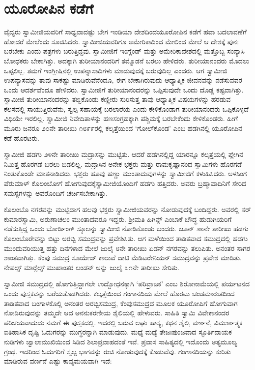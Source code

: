 
\chapter{ಯೂರೋಪಿನ ಕಡೆಗೆ }

 ವೈದ್ಯರು ಸ್ವಾಮೀಜಿಯವರಿಗೆ ಸಾಧ್ಯವಾದಷ್ಟು ಬೇಗ ಇಂಡಿಯಾ ದೇಶದಿಂದ\break ಯೂರೋಪಿನ ಕಡೆಗೆ ಹವಾ ಬದಲಾವಣೆಗೆ ಹೋದರೆ ಮೇಲೆಂದು ಸೂಚಿಸಿದರು. ಸ್ವಾಮೀಜಿಯವರಿಗೂ ಅಮೇರಿಕಾದಿಂದ ಮೇಲಿಂದ ಮೇಲೆ ಆ ದೇಶಕ್ಕೆ ಪುನಃ ಬರಬೇಕು ಎಂದು ಪತ್ರಗಳು ಬರುತ್ತಿದ್ದವು. ಸ್ವಾಮೀಜಿಗೆ ಇಂಗ್ಲೆಂಡ್ ಮತ್ತು ಅಮೇರಿಕಾದೇಶದಲ್ಲಿ ಮತ್ತೊಬ್ಬ ಸಂನ್ಯಾಸಿ ಬೋಧಕರು ಬೇಕಾಗಿತ್ತು. ಅದಕ್ಕಾಗಿ ತುರೀಯಾನಂದರಿಗೆ ತಮ್ಮೊಡನೆ ಬರಲು ಹೇಳಿದರು. ತುರೀಯಾನಂದರು ಮೊದಲು ಒಪ್ಪಲಿಲ್ಲ. ತಮಗೆ ಇಂಗ್ಲೀಷಿನಲ್ಲಿ ಉಪನ್ಯಾಸಾದಿಗಳು ಮಾಡುವುದಕ್ಕೆ ಬರುವುದಿಲ್ಲ ಎಂದರು. ಆಗ ಸ್ವಾಮೀಜಿ ಉಪನ್ಯಾಸವನ್ನು ತಾವು ಸಾಕಷ್ಟು ಮಾಡಿರುವೆನೆಂದೂ, ಈಗ ಬೇಕಾಗಿರುವುದು ಆಧ್ಯಾತ್ಮಿಕ ಜೀವನವನ್ನು ನಡೆಸುವವರ ಒಂದು ಆದರ್ಶವೆಂದೂ ಹೇಳಿದರು. ಸ್ವಾಮೀಜಿಗೆ ತುರೀಯಾನಂದರನ್ನು ಒಪ್ಪಿಸುವುದೇ ಒಂದು ದೊಡ್ಡ ಕಷ್ಟವಾಗಿತ್ತು. ಸ್ವಾಮೀಜಿ ತುರೀಯಾನಂದರನ್ನು ತಬ್ಬಿಕೊಂಡು ಕಣ್ಣೀರು ಸುರಿಸುತ್ತ ತಾವು ಆಧ್ಯಾತ್ಮಿಕ ವಿಷಯಗಳನ್ನು ಹರಡುವ ಕೆಲಸದಲ್ಲಿ ಸಾಯುತ್ತಿರುವೆನು, ಸ್ವಲ್ಪ ಸಹಾಯಕ್ಕೆ ಬರಲಾರೆಯ ಎಂದು ಕೇಳಿಕೊಂಡಾಗ ತುರೀಯಾನಂದರು ಒಪ್ಪಿಕೊಳ್ಳದೆ ವಿಧಿಯೇ ಇರಲಿಲ್ಲ. ಸ್ವಾಮೀಜಿ ನಿವೇದಿತಾಳನ್ನು ಹಣಸಂಗ್ರಹಕ್ಕಾಗಿ ಪಶ್ಚಿಮಕ್ಕೆ ಬರಬೇಕೆಂದು ಕೇಳಿಕೊಂಡರು. ಹೀಗೆ ಮೂರು ಜನರೂ ೨೦ನೇ ತಾರೀಖು ೧೮೯೯ರಲ್ಲಿ ಕಲ್ಕತ್ತೆಯಿಂದ ‘ಗೋಲ್‍ಕೊಂಡ’ ಎಂಬ ಹಡಗಿನಲ್ಲಿ ಯೂರೋಪಿನ ಕಡೆ ಹೊರಟರು. 

 ಸ್ವಾಮೀಜಿ ಹಡಗು ೨೪ನೇ ತಾರೀಖು ಮದ್ರಾಸನ್ನು ಮುಟ್ಟಿತು. ಆದರೆ ಹಡಗಿನಲ್ಲಿದ್ದ ಯಾರನ್ನೂ ಕಲ್ಕತ್ತೆಯಲ್ಲಿ ಪ್ಲೇಗಿನ ನಿಮಿತ್ತ ಹೊರಗಡೆ ಬರಲು ಬಿಡಲಿಲ್ಲ. ಮದ್ರಾಸಿನ ಅನೇಕ ಭಕ್ತರು ಮತ್ತು ರಾಮಕೃಷ್ಣಾನಂದ ಸ್ವಾಮಿಗಳು ಹೊರಗಡೆ ನಿಂತುಕೊಂಡೇ ಮಾತನಾಡಿದರು. ಭಕ್ತರು ಹೂವು ಹಣ್ಣು ಮುಂತಾದುವುಗಳನ್ನು ಸ್ವಾಮೀಜಿಗೆ ಕಳುಹಿಸಿದರು. ಅಳಸಿಂಗ ಪೆರುಮಾಳ್ ಕೊಲಂಬೋಗೆ ಹೋಗುವುದಕ್ಕೆ\break ಸ್ವಾಮೀಜಿಯೊಂದಿಗೆ ಹಡಗು ಹತ್ತಿದರು. ಅವರು ಬ್ರಹ್ಮಾವಾದಿನಿಗೆ ಸೇರಿದ ಸಮಸ್ಯೆಗಳನ್ನು ಅವರೊಂದಿಗೆ ಚರ್ಚಿಸಬೇಕಾಗಿತ್ತು. 

 ಕೊಲಂಬೊ ನಗರವನ್ನು ಮುಟ್ಟಿದಾಗ ಹಲವು ಭಕ್ತರು ಸ್ವಾಮೀಜಿಯವರನ್ನು ನೋಡುವುದಕ್ಕೆ ಬಂದಿದ್ದರು. ಅವರಲ್ಲಿ ಸರ್ ಕುಮಾರಸ್ವಾಮಿ, ಅರುಣಾಚಲಂ ಮುಂತಾದವರೂ ಇದ್ದರು. ಶ‍್ರೀಮತಿ ಹಿಗಿನ್ಸ್ ಎಂಬಾಕೆ ಬೌದ್ಧ ಹುಡುಗಿಯರಿಗೆ ನಡೆಸುತ್ತಿದ್ದ ಒಂದು ಬೋರ್ಡಿಂಗ್ ಸ್ಕೂಲನ್ನು ಸ್ವಾಮೀಜಿ ನೋಡಿಕೊಂಡು ಬಂದರು. ಜೂನ್ ೨೮ನೇ ತಾರೀಖು ಹಡಗು ಕೊಲಂಬೊರೇವನ್ನು ಬಿಟ್ಟು ಅರಬ್ಬಿ ಸಮುದ್ರವನ್ನು ಪ್ರವೇಶಿಸಿತು. ಆಗ ಮಳೆಯಿಂದ ತಾಡಿತವಾದ ಸಮುದ್ರದಲ್ಲಿ ಹಡಗು ಮುಂದುವರಿಯುತ್ತ ಹತ್ತು ದಿನಗಳಾದ ಮೇಲೆ ಜುಲೈ ೮ನೇ ತಾರೀಖು ಏಡನ್ ನಗರವನ್ನು ತಲುಪಿತು. ಅನಂತರ ಸಾಗರ ಶಾಂತವಾಗಿತ್ತು. ಕೆಂಪು ಸಮುದ್ರ ಸೂಯೇಜ್ ಕಾಲುವೆ ದಾಟಿ ಮೆಡಿಟರೇನಿಯನ್ ಸಮುದ್ರವನ್ನು ಪ್ರವೇಶ ಮಾಡಿತು. ನೇಪಲ್ಸ್ ಮಾರ್‍ಸೆಲ್ಸ್ ಮುಖಾಂತರ ಲಂಡನ್ ಅನ್ನು ಜುಲೈ ೩೧ನೇ ತಾರೀಖು ಸೇರಿತು. 

 ಸ್ವಾಮೀಜಿ ಸಮುದ್ರದಲ್ಲಿ ಹೋಗುತ್ತಿದ್ದಾಗಲೇ ಉದ್ಬೋಧನಕ್ಕಾಗಿ ‘ಪರಿವ್ರಾಜಕ’ ಎಂಬ ಶಿರೋನಾಮೆಯಲ್ಲಿ ಪರ್ಯಟನದ ಒಂದು ಪುಸ್ತಕವನ್ನು ಬರೆಯತೊಡಗಿದರು. ಕಲ್ಕತ್ತೆಯಿಂದ ಗಂಗಾನದಿಯ ಮೇಲೆ ಹೊರಟು ಚಂಡಮಾರುತದಿಂದ ತಾಡಿತವಾದ ಬಂಗಾಳಕೊಲ್ಲಿ ಅನಂತರ ಅರಬ್ಬಿಸಮುದ್ರ, ಕೆಂಪುಸಮುದ್ರದ ಮೂಲಕ ಯೂರೋಪಿಗೆ ಹೋಗುವಾಗ ನೋಡಿರುವುದನ್ನು ತಮ್ಮದೇ ಆದ ಅನನುಕರಣೀಯ ಶೈಲಿಯಲ್ಲಿ ಹೇಳುವರು. ಸಾಹಿತಿ ಸ್ವಾಮಿ ವಿವೇಕಾನಂದರ ಪರಿಚಯವಾದುದು ನಮಗೆ ಈ ಪುಸ್ತಕದಲ್ಲಿ. ಇದರಲ್ಲಿ ಬರುವ ಲಘು ಹಾಸ್ಯ, ಕಥನ ಶೈಲಿ, ವರ್ಣನೆ, ವಿಮರ್ಶಾತ್ಮಕ ಐತಿಹಾಸಿಕ ದೃಷ್ಟಿ ಓದುಗರನ್ನು ಮುಗ್ಧರನ್ನಾಗಿ ಮಾಡುವುದು. ಮಧ್ಯೆ ಮಧ್ಯೆ ತೇಜಃಪುಂಜವಾದ ಸ್ಫೂರ್ತಿದಾಯಕ ನುಡಿಗಳು ಜ್ವಾಲಾಮುಖಿಯಿಂದ ಸಿಡಿದ ಶಿಲಾಪ್ರವಾಹದಂತೆ ಇವೆ. ಪ್ರವಾಸ ಸಾಹಿತ್ಯದಲ್ಲಿ ಇದೊಂದು ಅತ್ಯಮೂಲ್ಯ ಗ್ರಂಥ. ಇದರಿಂದ ಓದುಗರಿಗೆ ಸ್ವಲ್ಪ ಭಾಗವನ್ನು ರುಚಿ ನೋಡುವುದಕ್ಕೆ ಕೊಡುವೆವು. ಗಂಗಾನದಿಯನ್ನು ಕುರಿತು ಮಾಡಿರುವ ವರ್ಣನೆ ಎಷ್ಟು ಕಾವ್ಯಮಯವಾಗಿ ಇದೆ: 

